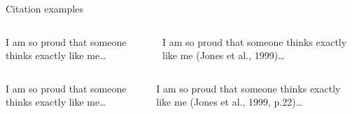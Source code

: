 \begin{frame}[fragile]{Citation examples}
		\pause
		
		\begin{columns}
			\vspace{-4.5mm}
\begin{codesource}
	I am so proud that someone thinks exactly
	like me\citep{jones99}\ldots
\end{codesource}
			I am so proud that someone thinks exactly
			like me (Jones et al., 1999)\ldots
		\end{columns}
	
		\begin{columns}
			\column{.49\textwidth}
			\vspace{-4.5mm}
\begin{codesource}
	I am so proud that someone thinks exactly
	like me\citep[p.22]{jones99}\ldots
\end{codesource}
			\column{.49\textwidth}
			I am so proud that someone thinks exactly
			like me (Jones et al., 1999, p.22)\ldots
		\end{columns}
\end{frame}